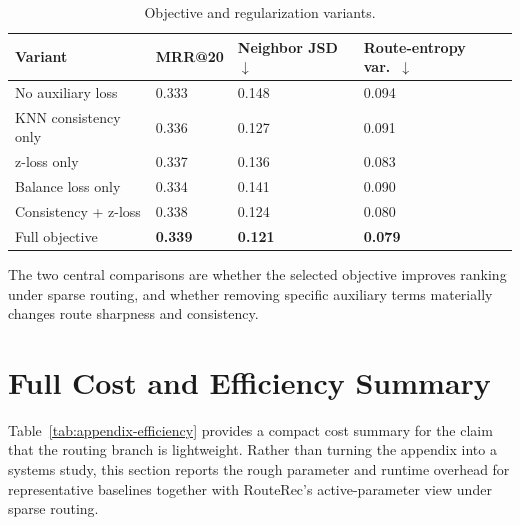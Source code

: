 \documentclass[sigconf,review,anonymous]{acmart}
\begin{document}
\begin{table}[H]
  \centering
  \caption{Objective and regularization variants.}
  \label{tab:appendix-objective}
  \footnotesize
  \setlength{\tabcolsep}{4pt}
  \begin{tabularx}{\columnwidth}{@{}>{\raggedright\arraybackslash}XYYY@{}}
    \toprule
    Variant & MRR@20 & Neighbor JSD $\downarrow$ & Route-entropy var.\ $\downarrow$ \\
    \midrule
    No auxiliary loss & 0.333 & 0.148 & 0.094 \\
    KNN consistency only & 0.336 & 0.127 & 0.091 \\
    z-loss only & 0.337 & 0.136 & 0.083 \\
    Balance loss only & 0.334 & 0.141 & 0.090 \\
    Consistency + z-loss & 0.338 & 0.124 & 0.080 \\
    Full objective & \textbf{0.339} & \textbf{0.121} & \textbf{0.079} \\
    \bottomrule
  \end{tabularx}
\end{table}

The two central comparisons are whether the selected objective improves ranking under sparse routing, and whether removing specific auxiliary terms materially changes route sharpness and consistency.

\section{Full Cost and Efficiency Summary}
\label{app:efficiency}
Table~\ref{tab:appendix-efficiency} provides a compact cost summary for the claim that the routing branch is lightweight. Rather than turning the appendix into a systems study, this section reports the rough parameter and runtime overhead for representative baselines together with RouteRec's active-parameter view under sparse routing.
\end{document}
